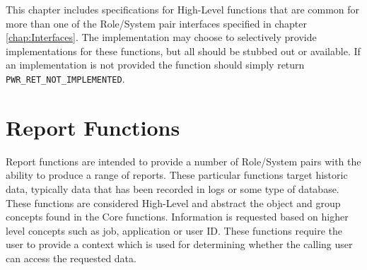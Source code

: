 
This chapter includes specifications for High-Level functions that are common for more than one of the Role/System pair interfaces specified in chapter \ref{chap:Interfaces}.
The implementation may choose to selectively provide implementations for these functions, but all should be stubbed out or available.
If an implementation is not provided the function should simply return \texttt{PWR_RET_NOT_IMPLEMENTED}.  



\section{Report Functions}\label{sec:ReportFunctions}

Report functions are intended to provide a number of Role/System pairs with the ability to produce a range of reports.
These particular functions target historic data, typically data that has been recorded in logs or some type of database.
These functions are considered High-Level and abstract the object and group concepts found in the Core functions.
Information is requested based on higher level concepts such as job, application or user ID.
These functions require the user to provide a context which is used for determining whether the calling user can access the requested data.


